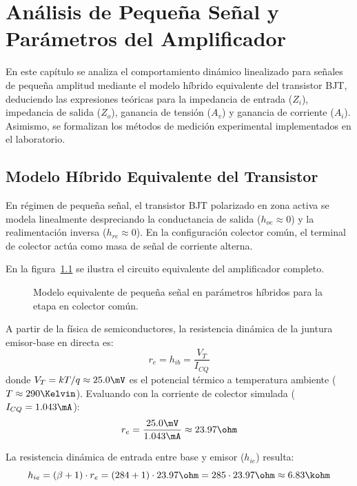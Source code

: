 \chapter{Análisis de Pequeña Señal y Parámetros del Amplificador}
\label{chap:pequena_senal}

En este capítulo se analiza el comportamiento dinámico linealizado para señales de pequeña amplitud mediante el
modelo híbrido equivalente del transistor BJT, deduciendo las expresiones teóricas para la impedancia de entrada
($Z_i$), impedancia de salida ($Z_o$), ganancia de tensión ($A_v$) y ganancia de corriente ($A_i$). Asimismo, se
formalizan los métodos de medición experimental implementados en el laboratorio.

\section{Modelo Híbrido Equivalente del Transistor}

En régimen de pequeña señal, el transistor BJT polarizado en zona activa se modela linealmente despreciando la
conductancia de salida ($h_{oe} \approx 0$) y la realimentación inversa ($h_{re} \approx 0$). En la configuración
colector común, el terminal de colector actúa como masa de señal de corriente alterna.

En la figura~\ref{crkt:pequena_senal} se ilustra el circuito equivalente del amplificador completo.

\begin{figure}[!ht]
  \centering
  
  \caption{Modelo equivalente de pequeña señal en parámetros híbridos para la etapa en colector común.}
  \label{crkt:pequena_senal}
\end{figure}

A partir de la física de semiconductores, la resistencia dinámica de la juntura emisor-base en directa es:
\begin{equation}
  r_e = h_{ib} = \frac{V_T}{I_{CQ}}
  \label{eq:re_formula}
\end{equation}
donde $V_T = k T / q \approx 25.0\mV$ es el potencial térmico a temperatura ambiente ($T \approx 290\Kelvin$). Evaluando
con la corriente de colector simulada ($I_{CQ} = 1.043\mA$):
\begin{equation}
  r_e = \frac{25.0\mV}{1.043\mA} \approx 23.97\ohm
\end{equation}

La resistencia dinámica de entrada entre base y emisor ($h_{ie}$) resulta:
\begin{equation}
  h_{ie} = (\beta + 1) \cdot r_e = (284 + 1) \cdot 23.97\ohm = 285 \cdot 23.97\ohm \approx 6.83\kohm
  \label{eq:hie_val}
\end{equation}


